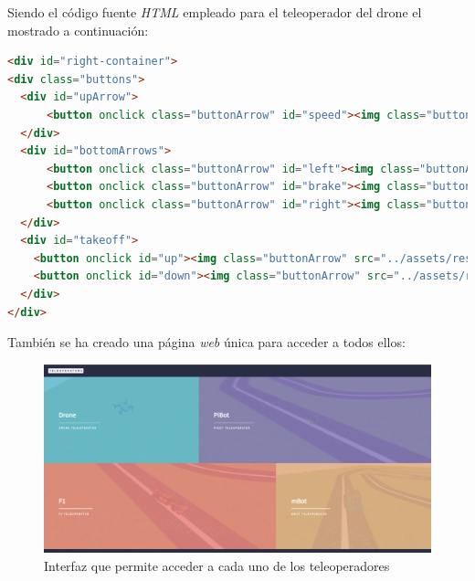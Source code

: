 Siendo el código fuente \textit{HTML} empleado para el teleoperador del drone el mostrado a continuación: 

\begin{lstlisting}[language=html,label=lst:teleop,caption=Código HTML del teleoperador del drone]
<div id="right-container">
<div class="buttons">
  <div id="upArrow">
      <button onclick class="buttonArrow" id="speed"><img class="buttonArrow" src="../assets/resources/speed.svg"/></button>
  </div>
  <div id="bottomArrows">
      <button onclick class="buttonArrow" id="left"><img class="buttonArrow" src="../assets/resources/left.svg"/></button>
      <button onclick class="buttonArrow" id="brake"><img class="buttonArrow" src="../assets/resources/brake.svg"/></button>
      <button onclick class="buttonArrow" id="right"><img class="buttonArrow" src="../assets/resources/right.svg"/></button><br>
  </div>
  <div id="takeoff">
    <button onclick id="up"><img class="buttonArrow" src="../assets/resources/goUp.svg"/></button>
    <button onclick id="down"><img class="buttonArrow" src="../assets/resources/goDown.svg"/></button>
  </div>
</div>
\end{lstlisting}

También se ha creado una página \textit{web} única para acceder a todos ellos: 

 \begin{figure}[H]
    \centering
    \includegraphics[scale=0.25]{img/teleoperators.png}
    \caption{Interfaz que permite acceder a cada uno de los teleoperadores} \label{fig:teleoperators}
\end{figure}

